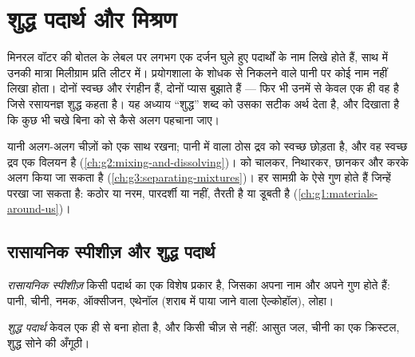 \chapter{शुद्ध पदार्थ और मिश्रण}\label{ch:g6:pure-substances-and-mixtures}

मिनरल वॉटर की बोतल के लेबल पर लगभग एक दर्जन घुले हुए पदार्थों के नाम
लिखे होते हैं, साथ में उनकी मात्रा मिलीग्राम प्रति लीटर में। प्रयोगशाला के
शोधक से निकलने वाले पानी पर कोई नाम नहीं लिखा होता। दोनों स्वच्छ और
रंगहीन हैं, दोनों प्यास बुझाते हैं --- फिर भी उनमें से केवल एक ही वह है
जिसे रसायनज्ञ शुद्ध कहता है। यह अध्याय ``शुद्ध'' शब्द को उसका सटीक अर्थ
देता है, और दिखाता है कि कुछ भी चखे बिना  को  से कैसे
अलग पहचाना जाए।

\begin{recall}
 यानी अलग-अलग चीज़ों को एक साथ रखना; पानी में  वाला ठोस द्रव
को स्वच्छ छोड़ता है, और वह स्वच्छ द्रव एक विलयन है
(\cref{ch:g2:mixing-and-dissolving})।  को चालकर, निथारकर,
छानकर और  करके अलग किया जा सकता है
(\cref{ch:g3:separating-mixtures})। हर सामग्री के ऐसे गुण होते हैं जिन्हें
परखा जा सकता है: कठोर या नरम, पारदर्शी या नहीं, तैरती है या डूबती है
(\cref{ch:g1:materials-around-us})।
\end{recall}

\section{रासायनिक स्पीशीज़ और शुद्ध पदार्थ}

\begin{definition}[रासायनिक स्पीशीज़]\label{def:g6:pure-substances-and-mixtures:species}
\emph{रासायनिक स्पीशीज़} किसी पदार्थ का एक
विशेष प्रकार है, जिसका अपना नाम और अपने गुण होते हैं: पानी, चीनी,
नमक, ऑक्सीजन, एथेनॉल (शराब में पाया जाने वाला ऐल्कोहॉल), लोहा।
\end{definition}

\begin{definition}[शुद्ध पदार्थ]\label{def:g6:pure-substances-and-mixtures:pure-substance}
\emph{शुद्ध पदार्थ} केवल एक ही 
से बना होता है, और किसी चीज़ से नहीं: आसुत जल, चीनी का एक क्रिस्टल,
शुद्ध सोने की अँगूठी।
\end{definition}

